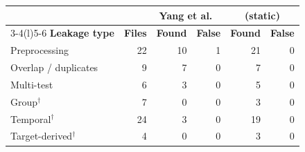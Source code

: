 \begin{tabular}{@{}lrrrrr@{}}
\toprule
 & & \multicolumn{2}{c}{\textbf{Yang et al.~\cite{yang2022}}} & \multicolumn{2}{c}{\textbf{\tool{} (static)}} \\
\cmidrule(lr){3-4}\cmidrule(l){5-6}
\textbf{Leakage type} & \textbf{Files} & \textbf{Found} & \textbf{False} & \textbf{Found} & \textbf{False} \\
\midrule
Preprocessing & 22 & 10 & 1 & 21 & 0 \\
Overlap / duplicates & 9 & 7 & 0 & 7 & 0 \\
Multi-test & 6 & 3 & 0 & 5 & 0 \\
\midrule
Group$^{\dagger}$ & 7 & 0 & 0 & 3 & 0 \\
Temporal$^{\dagger}$ & 24 & 3 & 0 & 19 & 0 \\
Target-derived$^{\dagger}$ & 4 & 0 & 0 & 3 & 0 \\
\bottomrule
\end{tabular}

